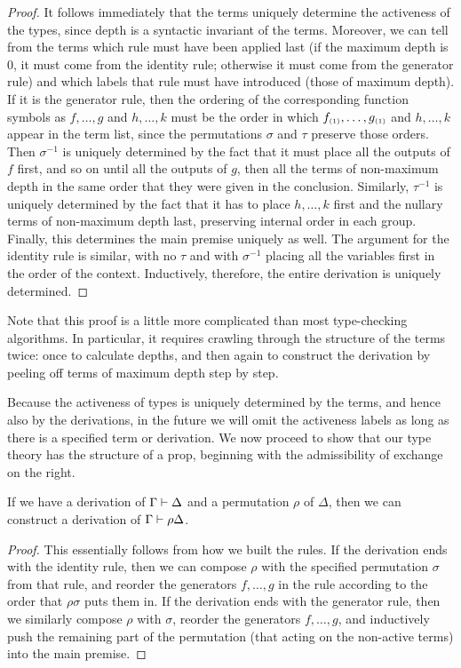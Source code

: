 \begin{props}
\begin{proof}
  It follows immediately that the terms uniquely determine the activeness of the types, since depth is a syntactic invariant of the terms.
  Moreover, we can tell from the terms which rule must have been applied last (if the maximum depth is $0$, it must come from the identity rule; otherwise it must come from the generator rule) and which labels that rule must have introduced (those of maximum depth).
  If it is the generator rule, then the ordering of the corresponding function symbols as $f,\dots,g$ and $h,\dots,k$ must be the order in which $f_{\scriptscriptstyle(1)},\dots,g_{\scriptscriptstyle(1)}$ and $h,\dots,k$ appear in the term list, since the permutations $\sigma$ and $\tau$ preserve those orders.
  Then $\sigma^{-1}$ is uniquely determined by the fact that it must place all the outputs of $f$ first, and so on until all the outputs of $g$, then all the terms of non-maximum depth in the same order that they were given in the conclusion.
  Similarly, $\tau^{-1}$ is uniquely determined by the fact that it has to place $h,\dots,k$ first and the nullary terms of non-maximum depth last, preserving internal order in each group.
  Finally, this determines the main premise uniquely as well.
  The argument for the identity rule is similar, with no $\tau$ and with $\sigma^{-1}$ placing all the variables first in the order of the context.
  Inductively, therefore, the entire derivation is uniquely determined.
\end{proof}

Note that this proof is a little more complicated than most type-checking algorithms.
In particular, it requires crawling through the structure of the terms twice: once to calculate depths, and then again to construct the derivation by peeling off terms of maximum depth step by step.

Because the activeness of types is uniquely determined by the terms, and hence also by the derivations, in the future we will omit the activeness labels as long as there is a specified term or derivation.
We now proceed to show that our type theory has the structure of a prop, beginning with the admissibility of exchange on the right.

\begin{lem}\label{thm:prop-symadm}
  If we have a derivation of $\Gamma\vdash \Delta$ and a permutation $\rho$ of $\Delta$, then we can construct a derivation of $\Gamma\vdash \rho\Delta$.
\end{lem}
\begin{proof}
  This essentially follows from how we built the rules.
  If the derivation ends with the identity rule, then we can compose $\rho$ with the specified permutation $\sigma$ from that rule, and reorder the generators $f,\dots,g$ in the rule according to the order that $\rho\sigma$ puts them in.
  If the derivation ends with the generator rule, then we similarly compose $\rho$ with $\sigma$, reorder the generators $f,\dots,g$, and inductively push the remaining part of the permutation (that acting on the non-active terms) into the main premise.
\end{proof}


\end{props}
